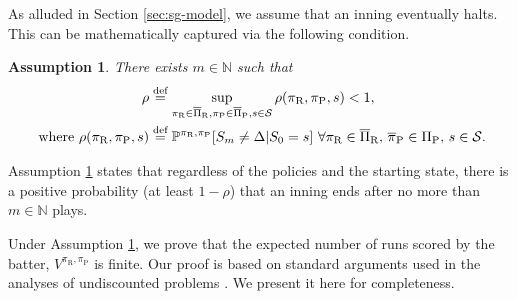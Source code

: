 \documentclass[11pt]{article}
\newtheorem{assumption}{Assumption}
\newcommand{\defeq}{\stackrel{\text{def}}{=}}
\begin{document}
       As alluded in Section \ref{sec:sg-model}, we assume that an inning eventually halts. This can be mathematically captured via the following condition.
       \begin{assumption}\label{assum:game_halts}
           There exists $m \in \mathbb{N}$ such that 
           \begingroup
           \allowdisplaybreaks
           \begin{align*}
                \rho &\defeq \sup_{\pi_\text{R} \in \overline\Pi_\text{R}, \pi_\text{P} \in \overline\Pi_\text{P}, s \in {\cal S}} \rho(\pi_\text{R},\pi_\text{P},s) < 1,\\
                \text{ where }       \rho(\pi_\text{R},\pi_\text{P},s) &\defeq \mathbb{P}^{\pi_\text{R}, \pi_\text{P}}[S_m \neq \Delta|S_0=s] \ \forall \pi_\text{R} \in \overline\Pi_\text{R}, \, \overline\pi_\text{P} \in \Pi_\text{P}, \, s \in {\cal S}.          
           \end{align*}
           \endgroup
       \end{assumption}
       \noindent Assumption \ref{assum:game_halts} states that regardless of the policies and the starting state, there is a positive probability (at least $1-\rho$) that an inning ends after no more than $m \in \mathbb{N}$ plays.
    
       Under Assumption \ref{assum:game_halts}, we prove that the expected number of runs scored by the batter, $V^{\pi_\text{R},\pi_\text{P}}$ is finite. Our proof is based on standard arguments used in the analyses of undiscounted problems \parencite[Section 7.2]{bertsekas_dynamic_2012}. We present it here for completeness.  
    
\end{document}

